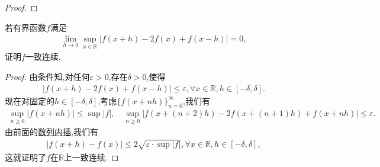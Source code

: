 \documentclass[../../main.tex]{subfiles}%
\begin{document}
\begin{proof}
\end{proof}

\begin{example}
若有界函数$f$满足
\begin{align*}
\lim_{h \to 0} \sup_{x \in \mathbb{R}} |f(x + h) - 2f(x) + f(x - h)| = 0,
\end{align*}
证明$f$一致连续.
\end{example}
\begin{proof}

由条件知,对任何$\varepsilon > 0$,存在$\delta > 0$,使得
\begin{align*}
|f(x + h) - 2f(x) + f(x - h)| \leqslant \varepsilon, \forall x \in \mathbb{R}, h \in [-\delta, \delta].
\end{align*}
现在对固定的$h \in [-\delta, \delta]$,考虑$\{f(x + nh)\}_{n=0}^\infty$,我们有
\begin{align*}
\sup_{n \geqslant 0} |f(x + nh)| \leqslant \sup |f|,\quad \sup_{n \geqslant 0} |f(x + (n + 2)h) - 2f(x + (n + 1)h) + f(x + nh)| \leqslant \varepsilon.
\end{align*}
由前面的\hyperref[proposition:数列内插]{数列内插},我们有
\begin{align*}
|f(x + h) - f(x)| \leqslant 2\sqrt{\varepsilon \cdot \sup |f|}, \forall x \in \mathbb{R}, h \in [-\delta, \delta],
\end{align*}
这就证明了$f$在$\mathbb{R}$上一致连续.

\end{proof}
\end{document}
